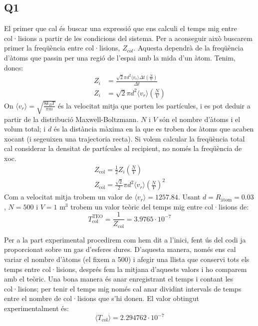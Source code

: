 \documentclass{article}
\begin{document}
	\subsection*{Q1}

	El primer que cal és buscar una expressió que ens calculi el temps mig entre col·lisions a partir de les condicions del sistema. Per a aconseguir això buscarem primer la freqüència entre col·lisions, $Z_{col}$. Aquesta dependrà de la freqüència d'àtoms que passin per una regió de l'espai amb la mida d'un àtom. Tenim, doncs:
	$$
	\begin{aligned}
		Z_i & =\frac{\sqrt{2} \pi d^2\langle v_r\rangle \Delta t\left(\frac{N}{V}\right)}{\Delta t} \\
		Z_i & =\sqrt{2} \pi d^2\langle v_r\rangle\left(\frac{N}{V}\right)
	\end{aligned}
	$$
	On $\langle v_r \rangle = \sqrt{\frac{8k_BT}{\pi m}}$ és la velocitat mitja que porten les partícules, i es pot deduir a partir de la distribució Maxwell-Boltzmann. $N$ i $V$ són el nombre d'àtoms i el volum total; i $d$ és la distància màxima en la que es troben dos àtoms que acaben xocant (i segeuixen una trajectoria recta). Si volem calcular la freqüència total cal considerar la densitat de partícules al recipient, no només la freqüència de xoc.
	$$
	\begin{gathered}
		Z_{\text{col}}=\frac{1}{2} Z_i\left(\frac{N}{V}\right) \\
		Z_{\text{col}}=\frac{\sqrt{2}}{2} \pi d^2\langle v_r\rangle\left(\frac{N}{V}\right)^2
	\end{gathered}
	$$
	Com a velocitat mitja trobem un valor de $\boxed{\langle v_r \rangle = 1257.84}$. Usant $d=R_{\text{àtom}} = 0.03$, $N=500$ i $V=1$ m$^3$ trobem un valor teòric del temps mig entre col·lisions de: 
	\begin{equation}
		\boxed{T_{\text{col}}^{\text{TEO}} = \frac{1}{Z_{\text{col}}} = 3.9765 \cdot 10^{-7}}
	\end{equation}
	
	
	
	\par Per a la part experimental procedirem com hem dit a l'inici, fent ús del codi ja proporcionat sobre un gas d'esferes dures. D'aquesta manera, només ens cal variar el nombre d'àtoms (el fixem a 500) i afegir una llista que conservi tots els temps entre col·lisions, després fem la mitjana d'aquests valors i ho comparem amb el teòric. Una bona manera és anar enregistrant el temps i contant les col·lisions; per tenir el temps mig només cal anar dividint intervals de temps entre el nombre de col·lisions que s'hi donen. El valor obtingut experimentalment és: 
	\begin{equation}
		\boxed{\langle T_{\text{col}}\rangle = 2.294762 \cdot 10^{-7}}
	\end{equation}
	 
\end{document}
